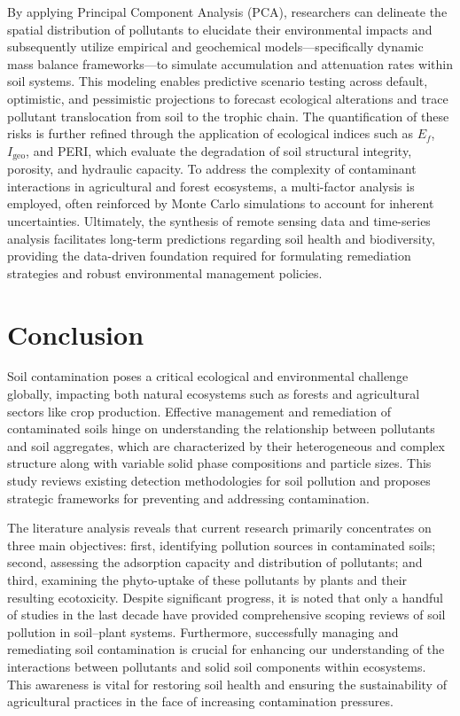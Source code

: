 \documentclass[sn-mathphys-num]{sn-jnl}
\begin{document}
By applying Principal Component Analysis (PCA), researchers can delineate the spatial distribution of pollutants to elucidate their environmental impacts and subsequently utilize empirical and geochemical models—specifically dynamic mass balance frameworks—to simulate accumulation and attenuation rates within soil systems. This modeling enables predictive scenario testing across default, optimistic, and pessimistic projections to forecast ecological alterations and trace pollutant translocation from soil to the trophic chain. The quantification of these risks is further refined through the application of ecological indices such as $E_f$, $I_{\text{geo}}$, and PERI, which evaluate the degradation of soil structural integrity, porosity, and hydraulic capacity. To address the complexity of contaminant interactions in agricultural and forest ecosystems, a multi-factor analysis is employed, often reinforced by Monte Carlo simulations to account for inherent uncertainties. Ultimately, the synthesis of remote sensing data and time-series analysis facilitates long-term predictions regarding soil health and biodiversity, providing the data-driven foundation required for formulating remediation strategies and robust environmental management policies.

\section{Conclusion}\label{sec5}

Soil contamination poses a critical ecological and environmental challenge
globally, impacting both natural ecosystems such as forests and agricultural
sectors like crop production. Effective management and remediation of
contaminated soils hinge on understanding the relationship between pollutants
and soil aggregates, which are characterized by their heterogeneous and
complex structure along with variable solid phase compositions and particle
sizes. This study reviews existing detection methodologies for soil pollution
and proposes strategic frameworks for preventing and addressing contamination.

The literature analysis reveals that current research primarily concentrates
on three main objectives: first, identifying pollution sources in contaminated
soils; second, assessing the adsorption capacity and distribution of
pollutants; and third, examining the phyto-uptake of these pollutants by
plants and their resulting ecotoxicity. Despite significant progress, it is
noted that only a handful of studies in the last decade have provided
comprehensive scoping reviews of soil pollution in soil--plant systems.
Furthermore, successfully managing and remediating soil contamination is
crucial for enhancing our understanding of the interactions between pollutants
and solid soil components within ecosystems. This awareness is vital for
restoring soil health and ensuring the sustainability of agricultural
practices in the face of increasing contamination pressures.
\end{document}
